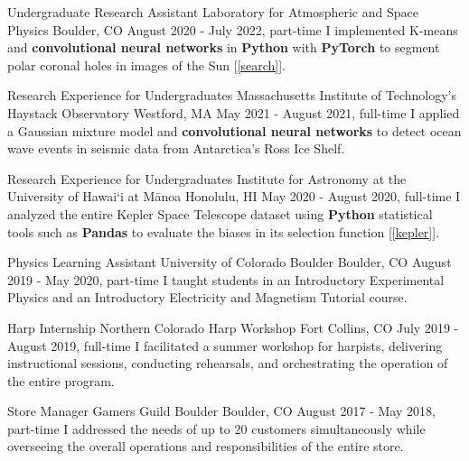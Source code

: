 \begin{cventries}
\vspace{0mm}


\cventry
{Undergraduate Research Assistant}
{Laboratory for Atmospheric and Space Physics}
{Boulder, CO}
{August 2020 - July 2022, part-time}
{
    I implemented K-means and \textbf{convolutional neural networks} in \textbf{Python} with \textbf{PyTorch} to segment polar coronal holes in images of the Sun [\ref{search}].
}

\vspace{0mm}

\cventry
{Research Experience for Undergraduates}
{Massachusetts Institute of Technology's Haystack Observatory}
{Westford, MA}
{May 2021 - August 2021, full-time}
{
    I applied a Gaussian mixture model and \textbf{convolutional neural networks} to detect ocean wave events in seismic data from Antarctica's Ross Ice Shelf.
}

\vspace{0mm}

\cventry
{Research Experience for Undergraduates}
{Institute for Astronomy at the University of Hawai`i at Mānoa}
{Honolulu, HI}
{May 2020 - August 2020, full-time}
{
    I analyzed the entire Kepler Space Telescope dataset using \textbf{Python} statistical tools such as \textbf{Pandas} to evaluate the biases in its selection function [\ref{kepler}].
}

\vspace{0mm}

\cventry
{Physics Learning Assistant}
{University of Colorado Boulder}
{Boulder, CO}
{August 2019 - May 2020, part-time}
{
    I taught students in an Introductory Experimental Physics and an Introductory Electricity and Magnetism Tutorial course.
}

\vspace{0mm}

\cventry
{Harp Internship}
{Northern Colorado Harp Workshop}
{Fort Collins, CO}
{July 2019 - August 2019, full-time}
{
    I facilitated a summer workshop for harpists, delivering instructional sessions, conducting rehearsals, and orchestrating the operation of the entire program.
}

\vspace{0mm}

\cventry
{Store Manager}
{Gamers Guild Boulder}
{Boulder, CO}
{August 2017 - May 2018, part-time}
{
    I addressed the needs of up to 20 customers simultaneously while overseeing the overall operations and responsibilities of the entire store.
}

\vspace{-2mm}

\end{cventries}
